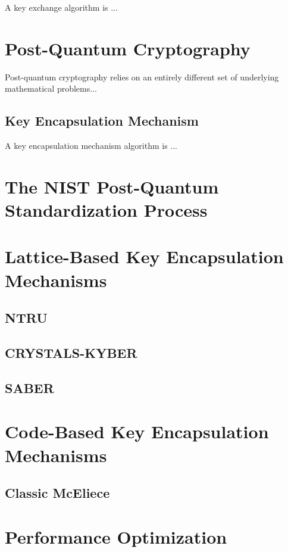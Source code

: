 A key exchange algorithm is ...

\section{Post-Quantum Cryptography}

Post-quantum cryptography relies on an entirely different set of underlying mathematical problems...

\subsection{Key Encapsulation Mechanism}

A key encapsulation mechanism algorithm is ...

\section{The NIST Post-Quantum Standardization Process}

\section{Lattice-Based Key Encapsulation Mechanisms}

\subsection{NTRU}

\subsection{CRYSTALS-KYBER}

\subsection{SABER}

\section{Code-Based Key Encapsulation Mechanisms}

\subsection{Classic McEliece}

\section{Performance Optimization}

